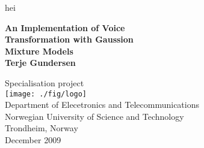 \begin{titlepage}
 
\begin{center}
 
\color{white} hei\\[1cm]
\color{black}

{ \huge \textbf{An Implementation of Voice\\[0.2cm] Transformation with Gaussion\\[0.5cm] Mixture Models}}\\[3cm]


 
{\LARGE \bf Terje Gundersen}
 
\vfill

\large Specialisation project \\[1.5cm]

\texttt{[image: ./fig/logo]}\\[0.5cm]
 



\large Department of Elecetronics and Telecommunications\\
Norwegian University of Science and Technology\\
Trondheim, Norway\\[0.5cm]


December 2009
 
\end{center}
 
\end{titlepage}
